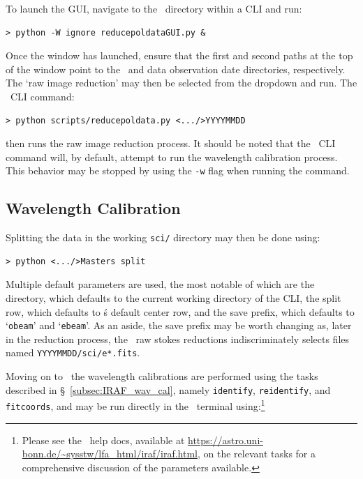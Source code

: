 To launch the \gls{GUI}, navigate to the \polsalt\ directory within a \gls{CLI} and run:

\begin{verbatim}> python -W ignore reducepoldataGUI.py &\end{verbatim}

\noindent Once the window has launched, ensure that the first and second paths at the top of the window point to the \polsalt\ and data observation date directories, respectively. The `raw image reduction' may then be selected from the dropdown and run. The \polsalt\ \gls{CLI} command:

\begin{verbatim}> python scripts/reducepoldata.py <.../>YYYYMMDD\end{verbatim}

\noindent then runs the raw image reduction process. It should be noted that the \polsalt\ \gls{CLI} command will, by default, attempt to run the wavelength calibration process. This behavior may be stopped by using the \texttt{-w} flag when running the command.
\prgph



\subsection{Wavelength Calibration} \label{subsec:reduc_wav}

Splitting the data in the working \texttt{sci/} directory may then be done using:

\begin{verbatim}> python <.../>Masters split\end{verbatim}

Multiple default parameters are used, the most notable of which are the directory, which defaults to the current working directory of the \gls{CLI}, the split row, which defaults to \polsalt\'s default center row, and the save prefix, which defaults to `\texttt{obeam}' and `\texttt{ebeam}'. As an aside, the save prefix may be worth changing as, later in the reduction process, the \polsalt\ raw stokes reductions indiscriminately selects files named \texttt{YYYYMMDD/sci/e*.fits}.
\prgph

Moving on to \iraf\, the wavelength calibrations are performed using the tasks described in \S~\ref{subsec:IRAF_wav_cal}, namely \texttt{identify}, \texttt{reidentify}, and \texttt{fitcoords}, and may be run directly in the \iraf\ terminal using:\footnote{Please see the \iraf\ help docs, available at \url{https://astro.uni-bonn.de/~sysstw/lfa_html/iraf/iraf.html}, on the relevant tasks for a comprehensive discussion of the parameters available.}

